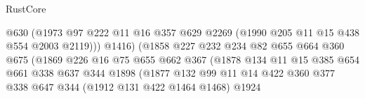 \begin{lexlean}{RustCore}
\begin{coremodule}
                                            @630
                                            (@1973
                                              @97
                                              @222
                                              @11
                                              @16
                                              @357
                                              @629
                                              @2269
                                              (@1990 @205 @11 @15 @438 @554 @2003 @2119)))
                                          @1416)
                                        (@1858
                                          @227
                                          @232
                                          @234
                                          @82
                                          @655
                                          @664
                                          @360
                                          @675
                                          (@1869
                                            @226
                                            @16
                                            @75
                                            @655
                                            @662
                                            @367
                                            (@1878
                                              @134
                                              @11
                                              @15
                                              @385
                                              @654
                                              @661
                                              @338
                                              @637
                                              @344
                                              @1898
                                              (@1877
                                                @132
                                                @99
                                                @11
                                                @14
                                                @422
                                                @360
                                                @377
                                                @338
                                                @647
                                                @344
                                                (@1912 @131 @422 @1464 @1468)
                                                @1924

\end{coremodule}
\end{lexlean}
